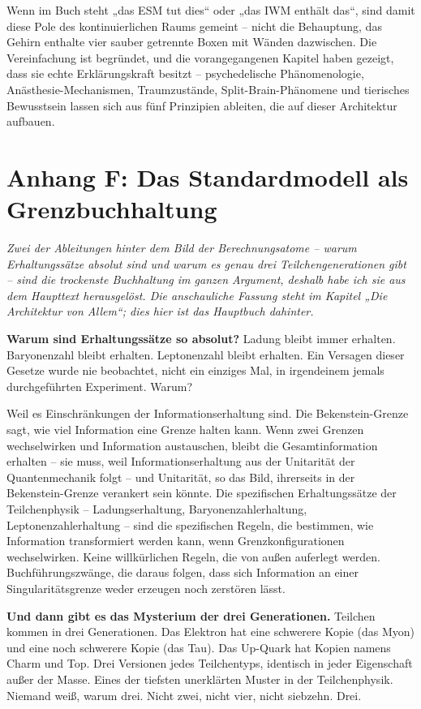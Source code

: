\documentclass[11pt, twoside, openright]{book}
\begin{document}
Wenn im Buch steht „das ESM tut dies“ oder „das IWM enthält das“, sind damit diese Pole des kontinuierlichen Raums gemeint -- nicht die Behauptung, das Gehirn enthalte vier sauber getrennte Boxen mit Wänden dazwischen. Die Vereinfachung ist begründet, und die vorangegangenen Kapitel haben gezeigt, dass sie echte Erklärungskraft besitzt -- psychedelische Phänomenologie, Anästhesie-Mechanismen, Traumzustände, Split-Brain-Phänomene und tierisches Bewusstsein lassen sich aus fünf Prinzipien ableiten, die auf dieser Architektur aufbauen.


\chapter*{Anhang F: Das Standardmodell als Grenzbuchhaltung}

\textit{Zwei der Ableitungen hinter dem Bild der Berechnungsatome -- warum Erhaltungssätze absolut sind und warum es genau drei Teilchengenerationen gibt -- sind die trockenste Buchhaltung im ganzen Argument, deshalb habe ich sie aus dem Haupttext herausgelöst. Die anschauliche Fassung steht im Kapitel „Die Architektur von Allem“; dies hier ist das Hauptbuch dahinter.}

\textbf{Warum sind Erhaltungssätze so absolut?} Ladung bleibt immer erhalten. Baryonenzahl bleibt erhalten. Leptonenzahl bleibt erhalten. Ein Versagen dieser Gesetze wurde nie beobachtet, nicht ein einziges Mal, in irgendeinem jemals durchgeführten Experiment. Warum?

Weil es Einschränkungen der Informationserhaltung sind. Die Bekenstein-Grenze sagt, wie viel Information eine Grenze halten kann. Wenn zwei Grenzen wechselwirken und Information austauschen, bleibt die Gesamtinformation erhalten -- sie muss, weil Informationserhaltung aus der Unitarität der Quantenmechanik folgt -- und Unitarität, so das Bild, ihrerseits in der Bekenstein-Grenze verankert sein könnte. Die spezifischen Erhaltungssätze der Teilchenphysik -- Ladungserhaltung, Baryonenzahlerhaltung, Leptonenzahlerhaltung -- sind die spezifischen Regeln, die bestimmen, wie Information transformiert werden kann, wenn Grenzkonfigurationen wechselwirken. Keine willkürlichen Regeln, die von außen auferlegt werden. Buchführungszwänge, die daraus folgen, dass sich Information an einer Singularitätsgrenze weder erzeugen noch zerstören lässt.

\textbf{Und dann gibt es das Mysterium der drei Generationen.} Teilchen kommen in drei Generationen. Das Elektron hat eine schwerere Kopie (das Myon) und eine noch schwerere Kopie (das Tau). Das Up-Quark hat Kopien namens Charm und Top. Drei Versionen jedes Teilchentyps, identisch in jeder Eigenschaft außer der Masse. Eines der tiefsten unerklärten Muster in der Teilchenphysik. Niemand weiß, warum drei. Nicht zwei, nicht vier, nicht siebzehn. Drei.
\end{document}
